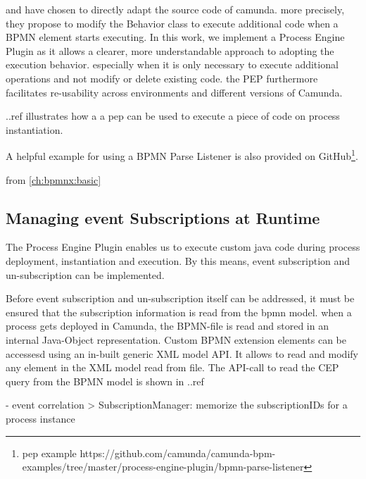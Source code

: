 \cite{mandal:2017} and \cite{Pufahl2017} have chosen to directly adapt the source code of camunda. more precisely, they propose to modify the Behavior class to execute additional code when a BPMN element starts executing.
In this work, we implement a Process Engine Plugin as it allows a clearer, more understandable approach to adopting the execution behavior. especially when it is only necessary to execute additional operations and not modify or delete existing code.
the PEP furthermore facilitates re-usability across environments and different versions of Camunda.

..ref illustrates how a a pep can be used to execute a piece of code on process instantiation.

A helpful example for using a BPMN Parse Listener is also provided on GitHub\footnote{pep example https://github.com/camunda/camunda-bpm-examples/tree/master/process-engine-plugin/bpmn-parse-listener}.




from \autoref{ch:bpmnx:basic}

\subsection{Managing event Subscriptions at Runtime}
The Process Engine Plugin enables us to execute custom java code during process deployment, instantiation and execution.
By this means, event subscription and un-subscription can be implemented.

Before event subscription and un-subscription itself can be addressed, it must be ensured that the subscription information is read from the bpmn model.
when a process gets deployed in Camunda, the BPMN-file is read and stored in an internal Java-Object representation.
Custom BPMN extension elements can be accessesd using an in-built generic XML model API.
It allows to read and modify any element in the XML model read from file. The API-call to read the CEP query from the BPMN model is shown in ..ref


- event correlation
> SubscriptionManager: memorize the subscriptionIDs for a process instance